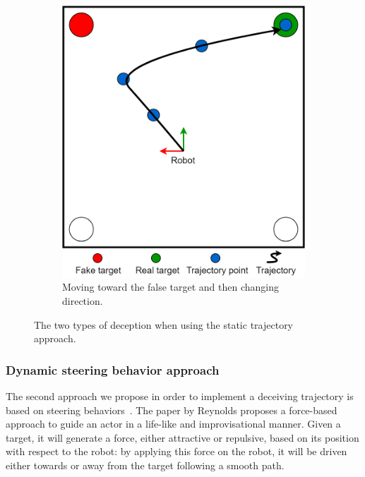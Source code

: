 \begin{figure}[H]
  \begin{subfigure}[t]{0.45\columnwidth}
  \centering
    \includegraphics[width=\linewidth]{images/06-deception/trajectoryLaura2}
    \caption{Moving toward the false target and then changing direction.}
    \label{fig:2}
  \end{subfigure}
  \caption{The two types of deception when using the static trajectory approach.}
  \label{fig::trajectoryStatic}
\end{figure}

\subsubsection{Dynamic steering behavior approach}
The second approach we propose in order to implement a deceiving trajectory is based on steering behaviors~\cite{reynolds1999steering}. The paper by Reynolds proposes a force-based approach to guide an actor in a life-like and improvisational manner. Given a target, it will generate a force, either attractive or repulsive, based on its position with respect to the robot: by applying this force on the robot, it will be driven either towards or away from the target following a smooth path.

